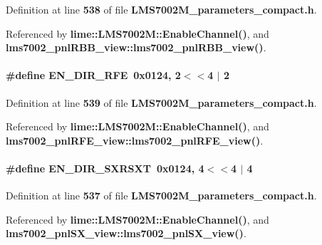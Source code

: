 Definition at line {\bf 538} of file {\bf L\+M\+S7002\+M\+\_\+parameters\+\_\+compact.\+h}.



Referenced by {\bf lime\+::\+L\+M\+S7002\+M\+::\+Enable\+Channel()}, and {\bf lms7002\+\_\+pnl\+R\+B\+B\+\_\+view\+::lms7002\+\_\+pnl\+R\+B\+B\+\_\+view()}.

\paragraph[{E\+N\+\_\+\+D\+I\+R\+\_\+\+R\+FE}]{\setlength{\rightskip}{0pt plus 5cm}\#define E\+N\+\_\+\+D\+I\+R\+\_\+\+R\+FE~0x0124, 2$<$$<$4 $\vert$  2}\label{LMS7002M__parameters__compact_8h_a891ab048214cf0602084c4d2077fc92f}


Definition at line {\bf 539} of file {\bf L\+M\+S7002\+M\+\_\+parameters\+\_\+compact.\+h}.



Referenced by {\bf lime\+::\+L\+M\+S7002\+M\+::\+Enable\+Channel()}, and {\bf lms7002\+\_\+pnl\+R\+F\+E\+\_\+view\+::lms7002\+\_\+pnl\+R\+F\+E\+\_\+view()}.

\paragraph[{E\+N\+\_\+\+D\+I\+R\+\_\+\+S\+X\+R\+S\+XT}]{\setlength{\rightskip}{0pt plus 5cm}\#define E\+N\+\_\+\+D\+I\+R\+\_\+\+S\+X\+R\+S\+XT~0x0124, 4$<$$<$4 $\vert$  4}\label{LMS7002M__parameters__compact_8h_a2916508777de66f118e8f15226a8e7b1}


Definition at line {\bf 537} of file {\bf L\+M\+S7002\+M\+\_\+parameters\+\_\+compact.\+h}.



Referenced by {\bf lime\+::\+L\+M\+S7002\+M\+::\+Enable\+Channel()}, and {\bf lms7002\+\_\+pnl\+S\+X\+\_\+view\+::lms7002\+\_\+pnl\+S\+X\+\_\+view()}.


